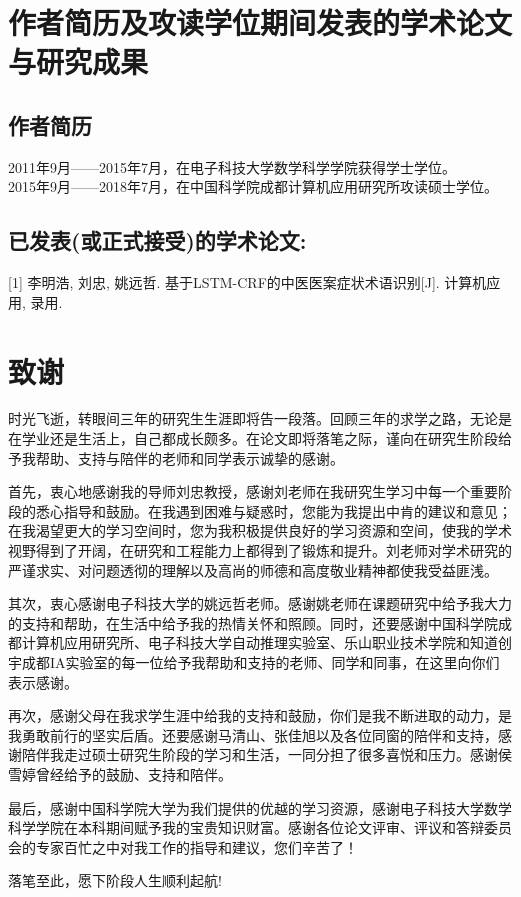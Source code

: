 \chapter{作者简历及攻读学位期间发表的学术论文与研究成果}
\section*{作者简历}
\noindent2011年9月——2015年7月，在电子科技大学数学科学学院获得学士学位。\\
\noindent2015年9月——2018年7月，在中国科学院成都计算机应用研究所攻读硕士学位。

\section*{已发表(或正式接受)的学术论文:}

[1] 李明浩, 刘忠, 姚远哲. 基于LSTM-CRF的中医医案症状术语识别[J]. 计算机应用, 录用.

\chapter{致\quad 谢}
时光飞逝，转眼间三年的研究生生涯即将告一段落。回顾三年的求学之路，无论是在学业还是生活上，自己都成长颇多。在论文即将落笔之际，谨向在研究生阶段给予我帮助、支持与陪伴的老师和同学表示诚挚的感谢。

首先，衷心地感谢我的导师刘忠教授，感谢刘老师在我研究生学习中每一个重要阶段的悉心指导和鼓励。在我遇到困难与疑惑时，您能为我提出中肯的建议和意见；在我渴望更大的学习空间时，您为我积极提供良好的学习资源和空间，使我的学术视野得到了开阔，在研究和工程能力上都得到了锻炼和提升。刘老师对学术研究的严谨求实、对问题透彻的理解以及高尚的师德和高度敬业精神都使我受益匪浅。

其次，衷心感谢电子科技大学的姚远哲老师。感谢姚老师在课题研究中给予我大力的支持和帮助，在生活中给予我的热情关怀和照顾。同时，还要感谢中国科学院成都计算机应用研究所、电子科技大学自动推理实验室、乐山职业技术学院和知道创宇成都IA实验室的每一位给予我帮助和支持的老师、同学和同事，在这里向你们表示感谢。

再次，感谢父母在我求学生涯中给我的支持和鼓励，你们是我不断进取的动力，是我勇敢前行的坚实后盾。还要感谢马清山、张佳旭以及各位同窗的陪伴和支持，感谢陪伴我走过硕士研究生阶段的学习和生活，一同分担了很多喜悦和压力。感谢侯雪婷曾经给予的鼓励、支持和陪伴。

最后，感谢中国科学院大学为我们提供的优越的学习资源，感谢电子科技大学数学科学学院在本科期间赋予我的宝贵知识财富。感谢各位论文评审、评议和答辩委员会的专家百忙之中对我工作的指导和建议，您们辛苦了！

落笔至此，愿下阶段人生顺利起航!
